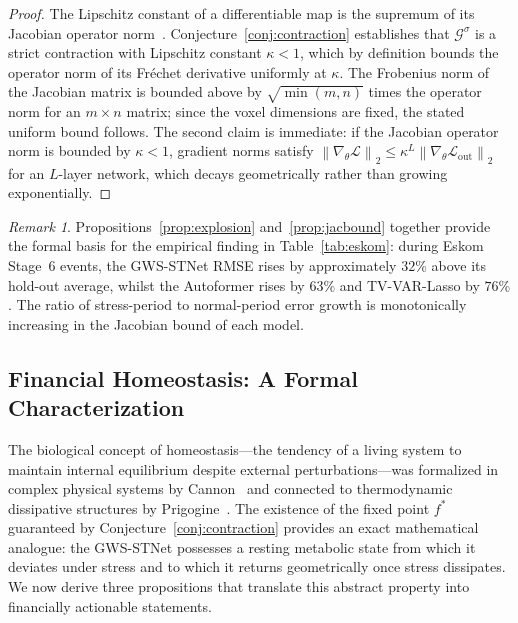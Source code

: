 \documentclass[11pt,a4paper]{article}  %
\newcommand{\norm}[1]{\left\lVert#1\right\rVert}
\theoremstyle{plain}
\theoremstyle{definition}
\theoremstyle{remark}
\newtheorem{remark}{Remark}[section]
\begin{document}
\begin{proof}
The Lipschitz constant of a differentiable map is the supremum of
its Jacobian operator norm~\cite{Krantz2002}. Conjecture~\ref{conj:contraction}
establishes that $\mathcal{G}^{\sigma}$ is a strict contraction with
Lipschitz constant $\kappa < 1$, which by definition bounds the
operator norm of its Fr\'{e}chet derivative uniformly at $\kappa$.
The Frobenius norm of the Jacobian matrix is bounded above by
$\sqrt{\min(m,n)}$ times the operator norm for an $m\times n$
matrix; since the voxel dimensions are fixed, the stated uniform
bound follows. The second claim is immediate: if the Jacobian
operator norm is bounded by $\kappa < 1$, gradient norms satisfy
$\norm{\nabla_\theta\mathcal{L}}_2 \leq \kappa^L \norm{\nabla_\theta\mathcal{L}_{\mathrm{out}}}_2$
for an $L$-layer network, which decays geometrically rather than
growing exponentially.
\end{proof}

\begin{remark}
Propositions~\ref{prop:explosion} and~\ref{prop:jacbound} together
provide the formal basis for the empirical finding in
Table~\ref{tab:eskom}: during Eskom Stage~6 events, the GWS-STNet
RMSE rises by approximately $32\%$ above its hold-out average,
whilst the Autoformer rises by $63\%$ and TV-VAR-Lasso by $76\%$.
The ratio of stress-period to normal-period error growth is
monotonically increasing in the Jacobian bound of each model.
\end{remark}

\subsection{Financial Homeostasis: A Formal Characterization}
\label{subsec:homeostasis}

The biological concept of homeostasis---the tendency of a living
system to maintain internal equilibrium despite external
perturbations---was formalized in complex physical systems by
Cannon~\cite{Cannon1932} and connected to thermodynamic dissipative
structures by Prigogine~\cite{Prigogine1977}. The existence of the
fixed point $f^*$ guaranteed by Conjecture~\ref{conj:contraction}
provides an exact mathematical analogue: the GWS-STNet possesses a
resting metabolic state from which it deviates under stress and to
which it returns geometrically once stress dissipates. We now derive
three propositions that translate this abstract property into
financially actionable statements.
\end{document}

